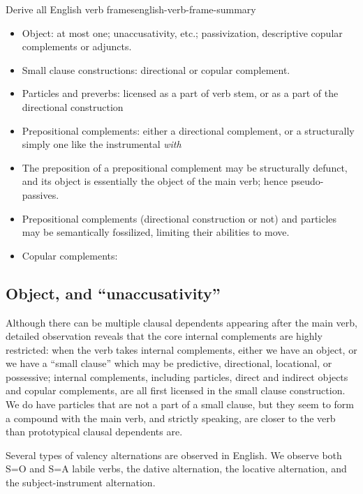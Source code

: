 \documentclass[UTF8, a4paper, oneside, scheme=plain, 12pt]{ctexbook}
\newcommand{\form}[1]{\emph{#1}}
\begin{document}
\begin{todobox}{Derive all English verb frames}{english-verb-frame-summary}
    \begin{itemize}
        \item Object: at most one; unaccusativity, etc.; passivization, descriptive copular complements or adjuncts.
        \item Small clause constructions: directional or copular complement.
        \item Particles and preverbs: licensed as a part of verb stem, or as a part of the directional construction
        \item Prepositional complements: either a directional complement, or a structurally simply one like the instrumental \form{with}
        \item The preposition of a prepositional complement may be structurally defunct,
        and its object is essentially the object of the main verb;
        hence pseudo-passives.
        \item Prepositional complements (directional construction or not) and particles
        may be semantically fossilized, limiting their abilities to move.
        \item Copular complements: 
    \end{itemize}
\end{todobox}

\subsection{Object, and ``unaccusativity''}

Although there can be multiple clausal dependents appearing after the main verb, 
detailed observation reveals that the core internal complements are highly restricted: 
when the verb takes internal complements,
either we have an object, or we have a ``small clause'' 
which may be predictive, directional, locational, or possessive; 
internal complements, including particles, direct and indirect objects and copular complements, 
are all first licensed in the small clause construction.
We do have particles that are not a part of a small clause, 
but they seem to form a compound with the main verb,
and strictly speaking, are closer to the verb than 
prototypical clausal dependents are.

Several types of valency alternations are observed in English.
We observe both S=O and S=A labile verbs,
the dative alternation,
the locative alternation,
and the subject-instrument alternation.
\end{document}
